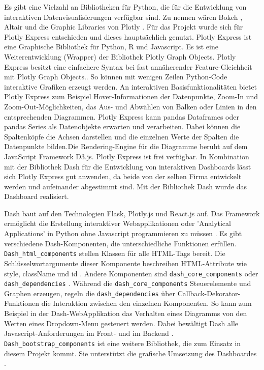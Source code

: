     Es gibt eine Vielzahl an Bibliotheken für Python, die für die Entwicklung von interaktiven Datenvisualisierungen verfügbar sind. Zu
    nennen wären Bokeh \cite[vgl.][]{van_de_ven_bokeh_2021}, Altair \cite[vgl.][]{altair_altair_2021} und die 
    Graphic Libraries von Plotly \cite[vgl.][]{plotly_plotly_2021}. Für das Projekt wurde sich für Plotly Express entschieden 
    und dieses hauptsächlich genutzt. 
    Plotly Express ist eine Graphische Bibliothek für Python, \textsf{R} und Javascript. Es ist eine Weiterentwicklung (Wrapper) der Bibliothek Plotly Graph Objects. 
    Plotly Express besitzt eine einfachere Syntax bei fast annäherender Feature-Gleichheit mit Plotly Graph Objects.\cite[][]{plotly_plotly_2021}.
    So können mit wenigen Zeilen Python-Code interaktive Grafiken erzeugt werden. 
    An interaktiven Basisfunktionalitäten bietet Plotly Express zum Beispiel Hover-Informationen der Datenpunkte, Zoom-In und Zoom-Out-Möglichkeiten,
    das Aus- und Abwählen von Balken oder Linien in den entsprechenden Diagrammen. Plotly Express kann pandas Dataframes 
    oder pandas Series als Datenobjekte erwarten und verarbeiten. Dabei können die Spaltenköpfe die Achsen darstellen 
    und die einzelnen Werte der Spalten die Datenpunkte bilden.Die Rendering-Engine für die Diagramme beruht auf dem JavaScript Framework D3.js. 
    Plotly Express ist frei verfügbar. In Kombination mit der Bibliothek Dash für die Entwicklung von interaktiven Dashboards lässt sich Plotly Express gut anwenden, 
    da beide von der selben Firma entwickelt werden und aufeinander abgestimmt sind. Mit der Bibliothek Dash wurde das Dashboard realisiert.
    
    Dash baut auf den Technologien Flask, Plotly.js und React.js auf. Das Framework ermöglicht die Erstellung interaktiver Webapplikationen 
    oder 'Analytical Applications' in Python ohne Javascript programmieren zu müssen \cite[vgl.][]{plotly_dash_2021}.
    Es gibt verschiedene Dash-Komponenten, die unterschiedliche Funktionen erfüllen. \texttt{Dash\_html\_components} stellen Klassen für alle HTML-Tags bereit.
    Die Schlüsselwortargumente dieser Komponente beschreiben HTML-Attribute wie style, className und id \cite[vgl.][]{plotly_dash_2021-2}. 
    Andere Komponenten sind \texttt{dash\_core\_components} oder \texttt{dash\_dependencies} \cite[vgl.][]{plotly_dash_2021-1}. Während die \texttt{dash\_core\_components}
    Steuerelemente und Graphen erzeugen, regeln die \texttt{dash\_dependencies} über Callback-Dekorator-Funktionen die Interaktion zwischen den einzelnen Komponenten.
    So kann zum Beispiel in der Dash-WebApplikation das Verhalten eines Diagramms von den Werten eines Dropdown-Menu gesteuert werden. 
    Dabei bewältigt Dash alle Javascript-Anforderungen im Front- und im Backend \cite[vgl.][]{plotly_dash_2021-3}.
    \texttt{Dash\_bootstrap\_components} ist eine weitere Bibliothek, die zum Einsatz in diesem Projekt kommt. Sie unterstützt die grafische Umsetzung
    des Dashboardes \cite[vgl.][]{faculty_dash_2021}.

